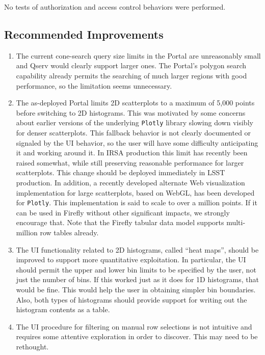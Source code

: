 \documentclass[DM,lsstdraft,STR,toc]{lsstdoc}
\begin{document}
No tests of authorization and access control behaviors were performed.


\subsection{Recommended Improvements}
\label{sect:recommendations}

\begin{enumerate}

\item{The current cone-search query size limits in the Portal are unreasonably small and Qserv would clearly support larger ones.
The Portal's polygon search capability already permits the searching of much larger regions with good performance,
so the limitation seems unnecessary.}
\item{The as-deployed Portal limits 2D scatterplots to a maximum of 5,000 points before switching to 2D histograms.
This was motivated by some concerns about earlier versions of the underlying \verb|Plotly| library slowing down visibly for denser scatterplots.
This fallback behavior is not clearly documented or signaled by the UI behavior,
so the user will have some difficulty anticipating it and working around it.
In IRSA production this limit has recently been raised somewhat, while still preserving reasonable performance for larger scatterplots.
This change should be deployed immediately in LSST production.
In addition, a recently developed alternate Web visualization implementation for large scatterplots, based on WebGL, has been developed for \verb|Plotly|.
This implementation is said to scale to over a million points.
If it can be used in Firefly without other significant impacts, we strongly encourage that.
Note that the Firefly tabular data model supports multi-million row tables already.}
\item{The UI functionality related to 2D histograms, called ``heat maps'', should be improved to support more quantitative exploitation.
In particular, the UI should permit the upper and lower bin limits to be specified by the user, not just the number of bins.
If this worked just as it does for 1D histograms, that would be fine.
This would help the user in obtaining simpler bin boundaries.
Also, both types of histograms should provide support for writing out the histogram contents as a table.}
\item{The UI procedure for filtering on manual row selections is not intuitive and requires some attentive exploration in order to discover.  This may need to be rethought.}

\end{enumerate}
\end{document}
